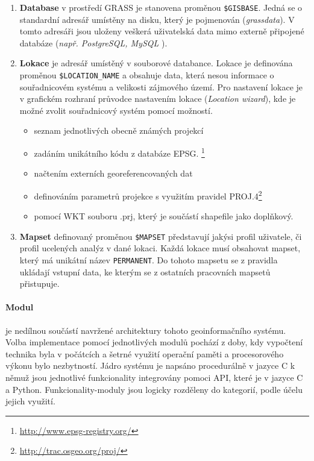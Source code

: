 \documentclass[a4paper,12pt,oneside]{report}
\begin{document}
\begin{enumerate}
\item \textbf{Database} v prostředí GRASS je stanovena proměnou \texttt{\$GISBASE}. Jedná se o standardní adresář umístěny na disku, který je pojmenován (\textit{grassdata}). V tomto adresáři jsou uloženy veškerá uživatelská data mimo externě připojené databáze (\textit{např. PostgreSQL, MySQL }).

\item \textbf{Lokace} je adresář umístěný v souborové databance. Lokace je definována proměnou   \texttt{\$LOCATION\_NAME}
a obsahuje data, která nesou informace o souřadnicovém systému a velikosti zájmového území. Pro nastavení lokace je v grafickém rozhraní průvodce nastavením lokace (\textit{Location wizard}), kde je možné zvolit souřadnicový systém pomocí možností.
\begin{itemize}
\item seznam jednotlivých obecně známých projekcí 
\item zadáním unikátního kódu z databáze \acs{EPSG}. \footnote{\url{http://www.epsg-registry.org/}}
\item načtením externích georeferencovaných dat
\item definováním parametrů projekce s využitím pravidel PROJ.4\footnote{\url{http://trac.osgeo.org/proj/}}
\item pomocí \ac{WKT} souboru .prj, který je součástí shapefile jako doplňkový.
\end{itemize}

\item \textbf{Mapset} definovaný proměnou \texttt{\$MAPSET} představují jakýsi profil uživatele, či profil ucelených analýz  v dané lokaci. Každá lokace musí obsahovat mapset, který má unikátní název \texttt{PERMANENT}. Do tohoto mapsetu se z pravidla ukládají vstupní data, ke kterým se z ostatních pracovních mapsetů přistupuje.
\end{enumerate}



\paragraph*{Modul} je nedílnou součástí navržené architektury tohoto geoinformačního systému. Volba implementace pomocí jednotlivých modulů pochází z doby, kdy vypočtení technika byla v počátcích a šetrné využití operační paměti a procesorového výkonu bylo nezbytností. Jádro systému je napsáno procedurálně v jazyce C k němuž jsou  jednotlivé funkcionality integrovány pomoci \acs{API}, které je v jazyce C a Python. Funkcionality-moduly jsou logicky rozděleny do kategorií, podle účelu jejich využití.
\end{document}
